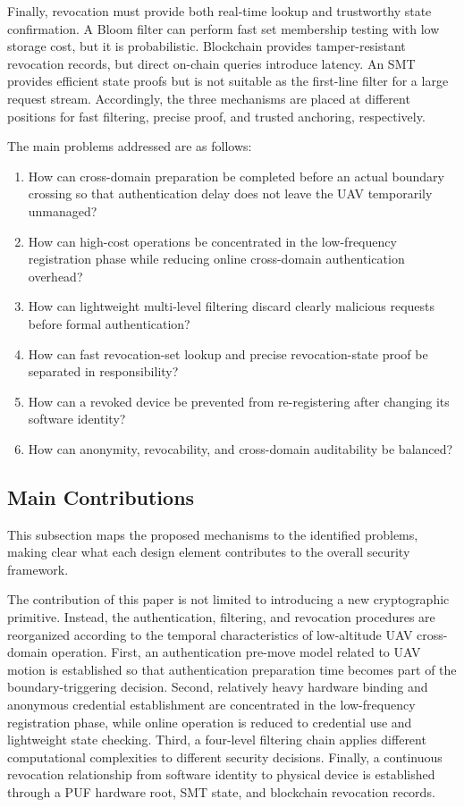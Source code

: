 \documentclass[lettersize,journal]{IEEEtran}
\begin{document}
	Finally, revocation must provide both real-time lookup and trustworthy state confirmation. A Bloom filter can perform fast set membership testing with low storage cost, but it is probabilistic. Blockchain provides tamper-resistant revocation records, but direct on-chain queries introduce latency. An SMT provides efficient state proofs but is not suitable as the first-line filter for a large request stream. Accordingly, the three mechanisms are placed at different positions for fast filtering, precise proof, and trusted anchoring, respectively.
	
	The main problems addressed are as follows:
	\begin{enumerate}
		\item How can cross-domain preparation be completed before an actual boundary crossing so that authentication delay does not leave the UAV temporarily unmanaged?
		\item How can high-cost operations be concentrated in the low-frequency registration phase while reducing online cross-domain authentication overhead?
		\item How can lightweight multi-level filtering discard clearly malicious requests before formal authentication?
		\item How can fast revocation-set lookup and precise revocation-state proof be separated in responsibility?
		\item How can a revoked device be prevented from re-registering after changing its software identity?
		\item How can anonymity, revocability, and cross-domain auditability be balanced?
	\end{enumerate}
	
	\subsection{Main Contributions}
	This subsection maps the proposed mechanisms to the identified problems, making clear what each design element contributes to the overall security framework.
	
	
	The contribution of this paper is not limited to introducing a new cryptographic primitive. Instead, the authentication, filtering, and revocation procedures are reorganized according to the temporal characteristics of low-altitude UAV cross-domain operation. First, an authentication pre-move model related to UAV motion is established so that authentication preparation time becomes part of the boundary-triggering decision. Second, relatively heavy hardware binding and anonymous credential establishment are concentrated in the low-frequency registration phase, while online operation is reduced to credential use and lightweight state checking. Third, a four-level filtering chain applies different computational complexities to different security decisions. Finally, a continuous revocation relationship from software identity to physical device is established through a PUF hardware root, SMT state, and blockchain revocation records.
	
\end{document}
